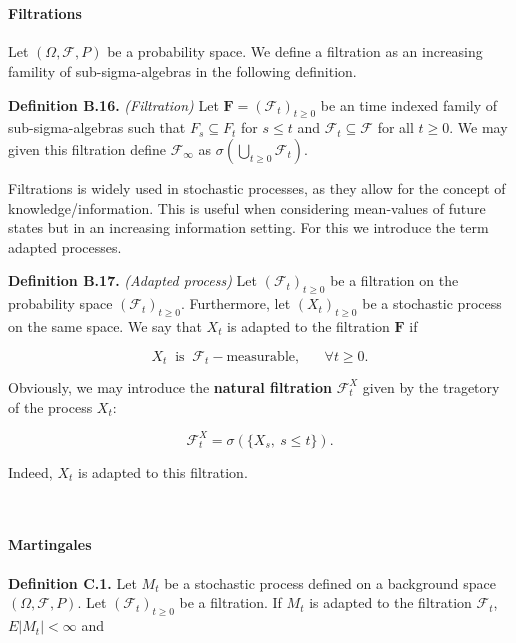 \documentclass[
]{article}
\begin{document}
~

\hypertarget{filtrations}{%
\paragraph{Filtrations}\label{filtrations}}

Let \((\Omega,\mathcal{F},P)\) be a probability space. We define a
filtration as an increasing famility of sub-sigma-algebras in the
following definition.

\textbf{Definition B.16.} \emph{(Filtration)} Let
\(\mathbf{F}=(\mathcal{F}_t)_{t\ge 0}\) be an time indexed family of
sub-sigma-algebras such that \(F_s\subseteq F_t\) for \(s\le t\) and
\(\mathcal{F}_t\subseteq \mathcal{F}\) for all \(t\ge 0\). We may given
this filtration define \(\mathcal{F}_\infty\) as
\(\sigma\left(\bigcup_{t\ge 0}\mathcal{F}_t\right)\).

Filtrations is widely used in stochastic processes, as they allow for
the concept of knowledge/information. This is useful when considering
mean-values of future states but in an increasing information setting.
For this we introduce the term adapted processes.

\textbf{Definition B.17.} \emph{(Adapted process)} Let
\((\mathcal{F}_t)_{t\ge 0}\) be a filtration on the probability space
\((\mathcal{F}_t)_{t\ge 0}\). Furthermore, let \((X_t)_{t\ge 0}\) be a
stochastic process on the same space. We say that \(X_t\) is adapted to
the filtration \(\mathbf{F}\) if

\[X_t\ \text{ is }\ \mathcal{F}_t-\text{measurable},\hspace{20pt}\forall t\ge 0.\]

Obviously, we may introduce the \textbf{natural filtration}
\(\mathcal{F}^X_t\) given by the tragetory of the process \(X_t\):

\[\mathcal{F}^X_t=\sigma(\{X_s,\ s\le t\}).\]

Indeed, \(X_t\) is adapted to this filtration.

~

\hypertarget{martingales}{%
\paragraph{Martingales}\label{martingales}}

\textbf{Definition C.1.} Let \(M_t\) be a stochastic process defined on
a background space \((\Omega,\mathcal{F},P)\). Let
\((\mathcal{F}_t)_{t\ge 0}\) be a filtration. If \(M_t\) is adapted to
the filtration \(\mathcal{F}_t\), \(E\vert M_t\vert <\infty\) and
\end{document}
